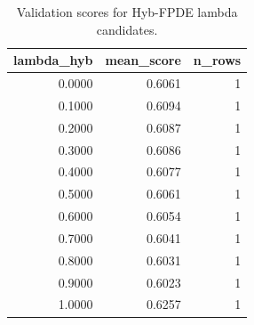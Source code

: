 \begin{table}[t]
\caption{Validation scores for Hyb-FPDE lambda candidates.}
\label{tab:lambda_distribution_computed}
\centering
\begin{tabular}{rrr}
\toprule
lambda\_hyb & mean\_score & n\_rows \\
\midrule
0.0000 & 0.6061 & 1 \\
0.1000 & 0.6094 & 1 \\
0.2000 & 0.6087 & 1 \\
0.3000 & 0.6086 & 1 \\
0.4000 & 0.6077 & 1 \\
0.5000 & 0.6061 & 1 \\
0.6000 & 0.6054 & 1 \\
0.7000 & 0.6041 & 1 \\
0.8000 & 0.6031 & 1 \\
0.9000 & 0.6023 & 1 \\
1.0000 & 0.6257 & 1 \\
\bottomrule
\end{tabular}

\end{table}
